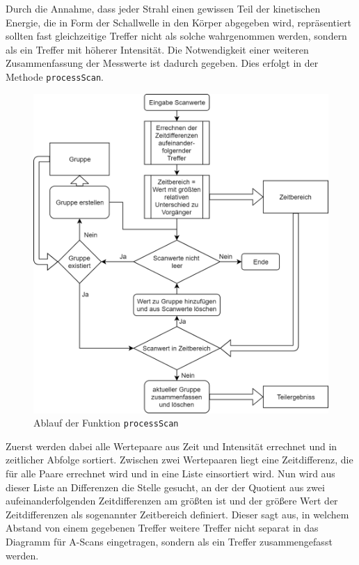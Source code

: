 \documentclass[reducespace,stylepage,semiarbeit]{spezidoc}
\begin{document}
Durch die Annahme, dass jeder Strahl einen gewissen Teil der kinetischen Energie, die in Form der Schallwelle in den Körper abgegeben wird, repräsentiert sollten fast gleichzeitige Treffer nicht als solche wahrgenommen werden, sondern als ein Treffer mit höherer Intensität. %
Die Notwendigkeit einer weiteren Zusammenfassung der Messwerte ist dadurch gegeben. 
Dies erfolgt in der Methode \texttt{processScan}. \par %
\begin{figure}
\includegraphics[scale=0.3]{pictures/Flowchart_processScan.png}
\caption{Ablauf der Funktion \texttt{processScan}}
\end{figure} 
Zuerst werden dabei alle Wertepaare aus Zeit und Intensität errechnet und in zeitlicher Abfolge sortiert. 
Zwischen zwei Wertepaaren liegt eine Zeitdifferenz, die für alle Paare errechnet wird und in eine Liste einsortiert wird.
Nun wird aus dieser Liste an Differenzen die Stelle gesucht, an der der Quotient aus zwei aufeinanderfolgenden Zeitdifferenzen am größten ist und der größere Wert der Zeitdifferenzen als sogenannter Zeitbereich definiert. 
Dieser sagt aus, in welchem Abstand von einem gegebenen Treffer weitere Treffer nicht separat in das Diagramm für A-Scans eingetragen, sondern als ein Treffer zusammengefasst werden.\\
\end{document}
